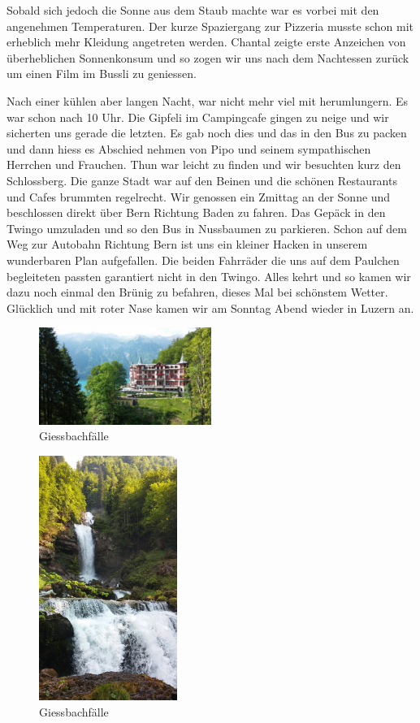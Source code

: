 Sobald sich jedoch die Sonne aus dem Staub machte war es vorbei mit den angenehmen Temperaturen.
Der kurze Spaziergang zur Pizzeria musste schon mit erheblich mehr Kleidung angetreten werden.
Chantal zeigte erste Anzeichen von überheblichen Sonnenkonsum und so zogen wir uns nach dem Nachtessen zurück um einen Film im Bussli zu geniessen.

Nach einer kühlen aber langen Nacht, war nicht mehr viel mit herumlungern.
Es war schon nach 10 Uhr.
Die Gipfeli im Campingcafe gingen zu neige und wir sicherten uns gerade die letzten.
Es gab noch dies und das in den Bus zu packen und dann hiess es Abschied nehmen von Pipo und seinem sympathischen Herrchen und Frauchen.
Thun war leicht zu finden und wir besuchten kurz den Schlossberg.
Die ganze Stadt war auf den Beinen und die schönen Restaurants und Cafes brummten regelrecht.
Wir genossen ein Zmittag an der Sonne und beschlossen direkt über Bern Richtung Baden zu fahren.
Das Gepäck in den Twingo umzuladen und so den Bus in Nussbaumen zu parkieren.
Schon auf dem Weg zur Autobahn Richtung Bern ist uns ein kleiner Hacken in unserem wunderbaren Plan aufgefallen.
Die beiden Fahrräder die uns auf dem Paulchen begleiteten passten garantiert nicht in den Twingo.
Alles kehrt und so kamen wir dazu noch einmal den Brünig zu befahren, dieses Mal bei schönstem Wetter.
Glücklich und mit roter Nase kamen wir am Sonntag Abend wieder in Luzern an.

\begin{figure}[H]
    \centering
    \includegraphics[width=0.5\textwidth]{../Bilder/Brienzersee/14.jpg}
    \caption{Giessbachfälle}
    \label{img:Brienzersee}
\end{figure}

\begin{figure}[H]
    \centering
    \includegraphics[width=0.4\textwidth]{../Bilder/Brienzersee/12.jpg}
    \caption{Giessbachfälle}
    \label{img:Brienzersee2}
\end{figure}
